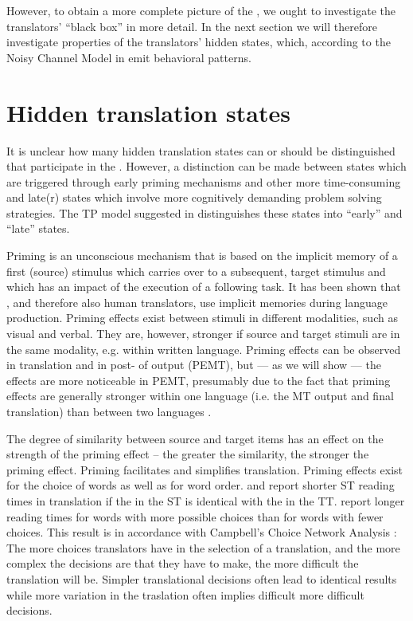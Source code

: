 \documentclass[output=paper]{LSP/langsci}
\begin{document}
However, to obtain a more complete picture of the , we ought to investigate the translators' ``black box'' in more detail. In the next section we will therefore investigate properties of the translators' hidden states, which, according to the Noisy Channel Model in  emit behavioral patterns.




\section{Hidden translation states}
\label{carl-schaeffer:sec:4}

It is unclear how many hidden translation states can or should be distinguished that participate in the . However, a distinction can be made between states which are triggered through early priming mechanisms and other more time-consuming and late(r) states which involve more cognitively demanding problem solving strategies. The TP model suggested in  distinguishes these states into ``early'' and ``late'' states. 

Priming is an unconscious mechanism that is based on the implicit memory of a first (source) stimulus which carries over to a subsequent, target stimulus and which has an impact of the execution of a following task. It has been shown that , and therefore also human translators, use implicit memories during language production. Priming effects exist between stimuli in different modalities, such as visual and verbal. They are, however, stronger if source and target stimuli are in the same modality, e.g. within written language. Priming effects can be observed in translation and in post- of  output (PEMT), but --- as we will show --- the effects are more noticeable in PEMT, presumably due to the fact that priming effects are generally stronger within one language (i.e. the MT output and final translation) than between two languages \citep{Pickering2008}. 


The degree of similarity between source and target items has an effect on the strength of the priming effect -- the greater the similarity, the stronger the priming effect. Priming facilitates and simplifies translation. Priming effects exist for the choice of words as well as for word
order. \citet{Jensen2009Distribution} and \citet{Ruiz2008Activation} report shorter ST reading times in translation if the  in the ST is identical with the  in the TT. \citet{Schaeffer2016Word} report longer reading times for words with more possible choices than for words with fewer choices. This result is in accordance with Campbell's Choice Network Analysis \citep{Campbell2000}: The more choices translators have in the selection of a translation, and the more complex the decisions are that they have to make, the more difficult the translation will be. Simpler translational decisions often lead to identical results while more variation in the traslation often implies difficult more difficult decisions.
\end{document}
